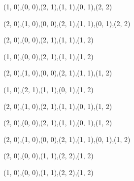 \begin{figure}
\begin{subfigure}[b]{0.14\textwidth}
    \resizebox{\linewidth}{!} {
       {{(1, 0),(0, 0),(2, 1),(1, 1),(0, 1),(2, 2)}} {{}}
    }
  \end{subfigure}
  \begin{subfigure}[b]{0.14\textwidth}
    \resizebox{\linewidth}{!} {
       {{(2, 0),(1, 0),(0, 0),(2, 1),(1, 1),(0, 1),(2, 2)}} {{}}
    }
  \end{subfigure}
  \begin{subfigure}[b]{0.14\textwidth}
    \resizebox{\linewidth}{!} {
       {{(2, 0),(0, 0),(2, 1),(1, 1),(1, 2)}} {{}}
    }
  \end{subfigure}
  \begin{subfigure}[b]{0.14\textwidth}
    \resizebox{\linewidth}{!} {
       {{(1, 0),(0, 0),(2, 1),(1, 1),(1, 2)}} {{}}
    }
  \end{subfigure}
  \begin{subfigure}[b]{0.14\textwidth}
    \resizebox{\linewidth}{!} {
       {{(2, 0),(1, 0),(0, 0),(2, 1),(1, 1),(1, 2)}} {{}}
    }
  \end{subfigure}
  \begin{subfigure}[b]{0.14\textwidth}
    \resizebox{\linewidth}{!} {
       {{(1, 0),(2, 1),(1, 1),(0, 1),(1, 2)}} {{}}
    }
  \end{subfigure}
  \begin{subfigure}[b]{0.14\textwidth}
    \resizebox{\linewidth}{!} {
       {{(2, 0),(1, 0),(2, 1),(1, 1),(0, 1),(1, 2)}} {{}}
    }
  \end{subfigure}
  \begin{subfigure}[b]{0.14\textwidth}
    \resizebox{\linewidth}{!} {
       {{(2, 0),(0, 0),(2, 1),(1, 1),(0, 1),(1, 2)}} {{}}
    }
  \end{subfigure}
  \begin{subfigure}[b]{0.14\textwidth}
    \resizebox{\linewidth}{!} {
       {{(2, 0),(1, 0),(0, 0),(2, 1),(1, 1),(0, 1),(1, 2)}} {{}}
    }
  \end{subfigure}
  \begin{subfigure}[b]{0.14\textwidth}
    \resizebox{\linewidth}{!} {
       {{(2, 0),(0, 0),(1, 1),(2, 2),(1, 2)}} {{}}
    }
  \end{subfigure}
  \begin{subfigure}[b]{0.14\textwidth}
    \resizebox{\linewidth}{!} {
       {{(1, 0),(0, 0),(1, 1),(2, 2),(1, 2)}} {{}}
    }
  \end{subfigure}

\end{figure}
